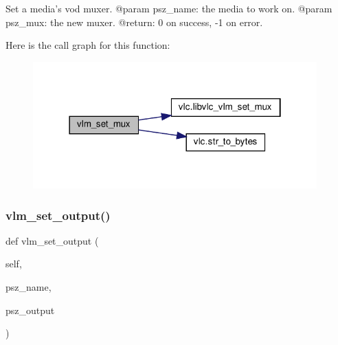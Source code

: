 \begin{DoxyVerb}Set a media's vod muxer.
@param psz_name: the media to work on.
@param psz_mux: the new muxer.
@return: 0 on success, -1 on error.
\end{DoxyVerb}
 Here is the call graph for this function\+:
\nopagebreak
\begin{figure}[H]
\begin{center}
\leavevmode
\includegraphics[width=310pt]{classvlc_1_1_instance_ae9782ac282ce7c000257f7f38393729f_cgraph}
\end{center}
\end{figure}
\mbox{\label{classvlc_1_1_instance_ab791d7f564fbc01a818279368454a39c}} 
\subsubsection{\texorpdfstring{vlm\+\_\+set\+\_\+output()}{vlm\_set\_output()}}
{\footnotesize\ttfamily def vlm\+\_\+set\+\_\+output (\begin{DoxyParamCaption}\item[{}]{self,  }\item[{}]{psz\+\_\+name,  }\item[{}]{psz\+\_\+output }\end{DoxyParamCaption})}

